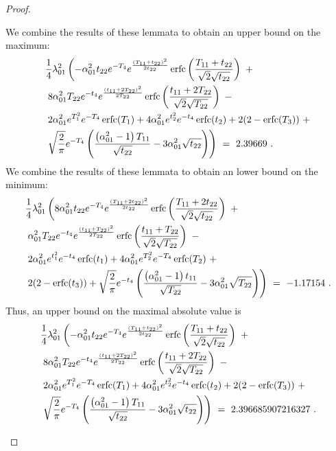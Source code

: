 \documentclass{article}
\DeclareMathOperator{\erfc}{erfc}
\begin{document}
\begin{proof}
\begin{itemize}
We combine the results of these lemmata to obtain 
an upper bound on the maximum:
\begin{align}
&\frac{1}{4} \lambda_{\rm 01}^2 \left(-\alpha_{\rm 01}^2
  t_{22} e^{-T_4}
  e^{\frac{(T_{11}+t_{22})^2}{2 t_{22}}}
  \erfc \left(\frac{T_{11}+t_{22}}{\sqrt{2}
  \sqrt{t_{22}}}\right)\ + \right. \\
  \nonumber &\left. 8 \alpha_{\rm 01}^2 T_{22}
  e^{-t_4} e^{\frac{(t_{11}+2 T_{22})^2}{2
  T_{22}}} \erfc \left(\frac{t_{11}+2
  T_{22}}{\sqrt{2} \sqrt{T_{22}}}\right)\ - \right. \\
  \nonumber &\left. 2 \alpha_{\rm 01}^2 e^{T_1^2} e^{-T_4}
  \erfc (T_1)+4 \alpha_{\rm 01}^2
  e^{t_2^2} e^{-t_4} \erfc (t_2)+2
  (2-\erfc (T_3))\ + \right. \\
  \nonumber &\left. \sqrt{\frac{2}{\pi }}
  e^{-T_4} \left(\frac{\left(\alpha_{\rm 01}^2-1\right)
  T_{11}}{\sqrt{t_{22}}}-3 \alpha_{\rm 01}^2
  \sqrt{t_{22}}\right)\right) \ = \ 
2.39669 \ .
\end{align}
We combine the results of these lemmata to obtain 
an lower bound on the minimum:
\begin{align}
&\frac{1}{4} \lambda_{\rm 01}^2 \left(8 \alpha_{\rm 01}^2
  t_{22} e^{-T_4} e^{\frac{(T_{11}+2
  t_{22})^2}{2 t_{22}}}
  \erfc \left(\frac{T_{11}+2 t_{22}}{\sqrt{2}
  \sqrt{t_{22}}}\right)\ + \right. \\
  \nonumber &\left. \alpha_{\rm 01}^2 T_{22}
  e^{-t_4} e^{\frac{(t_{11}+T_{22})^2}{2
  T_{22}}}
  \erfc \left(\frac{t_{11}+T_{22}}{\sqrt{2}
  \sqrt{T_{22}}}\right)\ - \right. \\
  \nonumber &\left. 2 \alpha_{\rm 01}^2
  e^{t_1^2} e^{-t_4} \erfc (t_1)+4
  \alpha_{\rm 01}^2 e^{T_2^2} e^{-T_4}
  \erfc (T_2)\ + \right. \\
  \nonumber &\left. 2
  (2-\erfc (t_3))+\sqrt{\frac{2}{\pi }}
  e^{-t_4} \left(\frac{\left(\alpha_{\rm 01}^2-1\right)
  t_{11}}{\sqrt{T_{22}}}-3 \alpha_{\rm 01}^2
  \sqrt{T_{22}}\right)\right) \ = \
-1.17154 \ .
\end{align}
Thus, an upper bound on the maximal absolute value is 
\begin{align}
&\frac{1}{4} \lambda_{\rm 01}^2 \left(-\alpha_{\rm 01}^2
  t_{22} e^{-T_4}
  e^{\frac{(T_{11}+t_{22})^2}{2 t_{22}}}
  \erfc \left(\frac{T_{11}+t_{22}}{\sqrt{2}
  \sqrt{t_{22}}}\right)\ + \right. \\
  \nonumber &\left. 8 \alpha_{\rm 01}^2 T_{22}
  e^{-t_4} e^{\frac{(t_{11}+2 T_{22})^2}{2
  T_{22}}} \erfc \left(\frac{t_{11}+2
  T_{22}}{\sqrt{2} \sqrt{T_{22}}}\right)\ - \right. \\
  \nonumber &\left. 2 \alpha_{\rm 01}^2 e^{T_1^2} e^{-T_4}
  \erfc (T_1)+4 \alpha_{\rm 01}^2
  e^{t_2^2} e^{-t_4} \erfc (t_2)+2
  (2-\erfc (T_3))\ + \right. \\
  \nonumber &\left. \sqrt{\frac{2}{\pi }}
  e^{-T_4} \left(\frac{\left(\alpha_{\rm 01}^2-1\right)
  T_{11}}{\sqrt{t_{22}}}-3 \alpha_{\rm 01}^2
  \sqrt{t_{22}}\right)\right) \ = \ 
2.396685907216327\ .
\end{align}
\end{itemize}
\end{proof}
\end{document}
